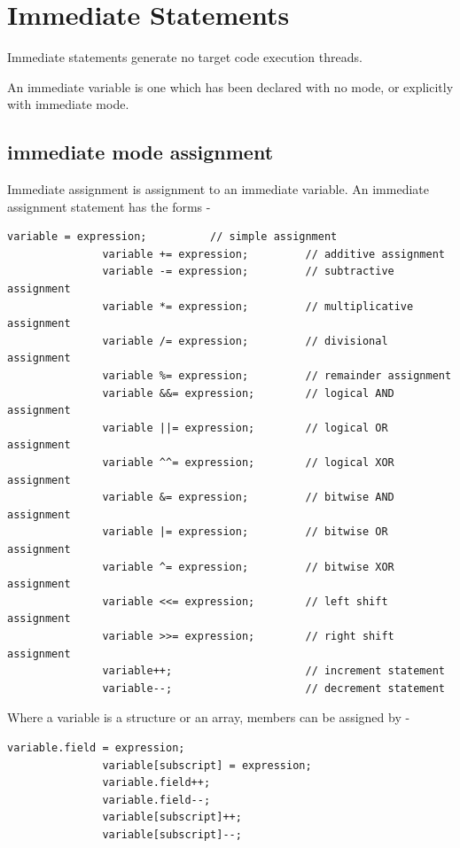 \pagebreak

\chapter{Immediate Statements}\label{chap:immed}

    Immediate statements generate no target code execution threads.

    An immediate variable is one which has been declared with no mode, or
    explicitly with immediate mode.


    \section{immediate mode assignment}\label{sec:im_ass}

        Immediate assignment is assignment to an immediate variable.
        An immediate assignment statement has the forms -
        \begin{lstlisting}[gobble=8, language=threepl]
               variable = expression;          // simple assignment
               variable += expression;         // additive assignment
               variable -= expression;         // subtractive assignment
               variable *= expression;         // multiplicative assignment
               variable /= expression;         // divisional assignment
               variable %= expression;         // remainder assignment
               variable &&= expression;        // logical AND assignment
               variable ||= expression;        // logical OR assignment
               variable ^^= expression;        // logical XOR assignment
               variable &= expression;         // bitwise AND assignment
               variable |= expression;         // bitwise OR assignment
               variable ^= expression;         // bitwise XOR assignment
               variable <<= expression;        // left shift assignment
               variable >>= expression;        // right shift assignment
               variable++;                     // increment statement
               variable--;                     // decrement statement
        \end{lstlisting}
        Where a variable is a structure or an array, members can
        be assigned by -
        \begin{lstlisting}[gobble=8, language=threepl]
               variable.field = expression;
               variable[subscript] = expression;
               variable.field++;
               variable.field--;
               variable[subscript]++;
               variable[subscript]--;
        \end{lstlisting}
        
